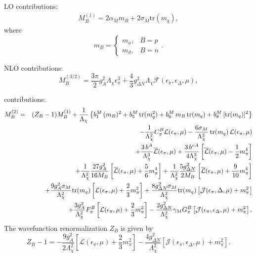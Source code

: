 \documentclass[12pt,tightenlines, raggedbottom, prd, notitlepage]{revtex4-1}
\def\tr{\text{tr}}
\def\c#1{{\mathcal #1}}
\def\ol#1{{\overline{#1}}}
\begin{document}
LO contributions:
\begin{align*}
M^{(1)}_B 
= 2 \alpha_M m_B + 2 \sigma_M \tr(m_q),
\end{align*}
where
\begin{equation}\label{eq:mB}
  m_B = \left\{
    \begin{array}{lc}
      m_u, & B=p \\
      m_d, & B=n
    \end{array}\right. .
\end{equation}

NLO contributions:
\begin{equation}
  M^{(3/2)}_B = 
  \frac{3\pi}{2} g_A^2 \Lambda_\chi \epsilon_\pi^3 
    + \frac{4}{3} g_{\Delta N}^2 \Lambda_\chi \c{F} (\epsilon_\pi,\epsilon_\Delta,\mu)
,
\end{equation}

 contributions:
\begin{eqnarray}
M_B^{(2)} &=& ( Z_B - 1) M_B^{(1)} 
  + \frac{1}{\Lambda_\chi} \left\{
    b_1^M \, (m_B)^2 + b_5^M \, \tr (m_q^2) + b_6^M \, m_B \, \tr(m_q)
    + b_8^M \, [\tr(m_q)]^2 \right\} \notag \\
&& 
  - \frac{1}{\Lambda_\chi^2} C^B_\pi \c{L} (\epsilon_\pi,\mu) 
    - \frac{6 \sigma_M}{\Lambda_\chi^2} \, \tr(m_q)\,  \c{L} (\epsilon_\pi,\mu) \notag \\
&& 
  + \frac{3\, b^A}{\Lambda_\chi^3} \ol{\c{L}} (\epsilon_\pi, \mu) 
    + \frac{3\, b^{vA}}{4\Lambda_\chi^3} \left[\ol{\c{L}} (\epsilon_\pi, \mu) - \frac{1}{2} m_\pi^4 \right] \notag \\
&& 
  + \frac{1}{\Lambda_\chi^2} \frac{27 g_A^2}{16 M_B} 
     \left[\ol{\c{L}} (\epsilon_\pi, \mu) + \frac{5}{6} m_\pi^4 \right]
    + \frac{1}{\Lambda_\chi^2} \frac{5 g_{\Delta N}^2}{2 M_B}
     \left[\ol{\c{L}} (\epsilon_\pi, \mu) + \frac{9}{10} m_\pi^4 \right] \notag \\
&& 
  + \frac{ 9 g_A^2 \sigma_M }{\Lambda_\chi^2} \tr (m_q) 
     \left[ \c{L} (\epsilon_\pi, \mu) + \frac{2}{3} m_\pi^2 \right] 
    + \frac{8 g_{\Delta N}^2 \sigma_M }{\Lambda_\chi^2} \tr(m_q)
     \left[ \c{J} (\epsilon_\pi, \Delta, \mu) + m_\pi^2 \right] \notag \\
&& 
  + \frac{3g_A^2}{\Lambda_\chi^2} F^B_\pi \left[ \c{L} (\epsilon_\pi, \mu) + \frac{2}{3} m_\pi^2 \right]
     - \frac{2 g_{\Delta N}^2}{\Lambda_\chi^2} \gamma_M G^B_\pi
     \left[ \c{J} (\epsilon_\pi, \epsilon_\Delta, \mu) + m_\pi^2 \right] 
.\label{e:MBNNLO} \end{eqnarray}
%
The wavefunction renormalization $Z_B$ is given by
\begin{equation}
  Z_B - 1 = 
     - \frac{9 g_A^2}{2\Lambda_\chi^2} \left[  \c{L}(\epsilon_\pi , \mu) +
       \frac{2}{3} m_\pi^2 \right]
     - \frac{4 g_{\Delta N}^2}{\Lambda_\chi^2 } \left[ \c{J}(\epsilon_\pi, \epsilon_\Delta, \mu) +
       m_\pi^2 \right]
.\label{e:ZB} 
\end{equation}
\end{document}
